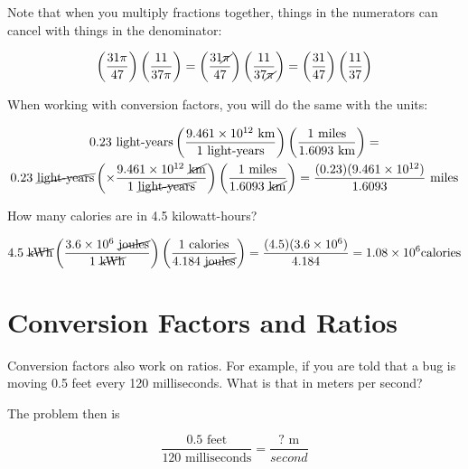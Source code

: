 Note that when you multiply fractions together, things in the numerators can cancel with things in the denominator:

$$\left( \frac{31\pi}{47} \right) \left( \frac{11}{37\pi}\right) = \left(\frac{31\cancel{\pi}}{47}\right) \left( \frac{11}{37\cancel{\pi}}\right) = \left(\frac{31}{47} \right) \left( \frac{11}{37} \right)$$

When working with conversion factors, you will do the same with the units:

\begin{multline*}
  0.23 \text{ light-years} \left( \frac{9.461 \times 10^{12} \text{ km}}{1 \text{ light-years}} \right) \left( \frac{1 \text{ miles}}{1.6093 \text{ km}} \right) = \\
  0.23 \text{ \cancel{light-years}} \left( \times \frac{9.461 \times 10^{12} \text{ \cancel{km}}}{1 \text{ \cancel{light-years}}} \right) \left( \frac{1 \text{ miles}}{1.6093 \text{ \cancel{km}}}\right) = \frac{(0.23)(9.461 \times 10^{12})}{1.6093} \text{ miles}$$
\end{multline*}

\begin{Exercise}[title={Simple Conversion Factors}, label=simple_conversion_factors]

  How many calories are in 4.5 kilowatt-hours?

\end{Exercise}
\begin{Answer}[ref=simple_conversion_factors]

  $$4.5 \text{ \cancel{kWh}} \left( \frac{3.6 \times 10^{6} \text{ \cancel{joules}}}{1 \text{ \cancel{kWh}}} \right) \left( \frac{1 \text{ calories}}{4.184 \text{ \cancel{joules}}}\right) = \frac{(4.5)(3.6 \times 10^6)}{4.184} = 1.08 \times 10^6 \text {calories}$$

\end{Answer}

\section{Conversion Factors and Ratios}

Conversion factors also work on ratios.  For example, if you are told
that a bug is moving 0.5 feet every 120 milliseconds. What is that in
meters per second?

The problem then is

$$\frac{0.5 \text{ feet}}{120 \text{ milliseconds}} = \frac{\text{? m}}{second}$$

